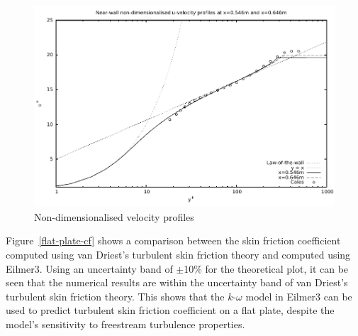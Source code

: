 %
\begin{figure}[h]
 \begin{center}
  \includegraphics[width=12.5cm]{./chap2-flat-plate/figs/coles-x-dimensionless.pdf}
 \end{center}
 \caption{Non-dimensionalised velocity profiles}
 \label{flat-plate-dimensionless-velocity}
\end{figure}
%
Figure~\ref{flat-plate-cf} shows a comparison between the skin friction coefficient 
computed using van Driest's turbulent skin friction theory and computed using Eilmer3. 
Using an uncertainty band of $\pm$10\% for the theoretical plot, it can be seen that 
the numerical results are within the uncertainty band of van Driest's turbulent skin 
friction theory. This shows that the $k$-$\omega$ model in Eilmer3 can be used to 
predict turbulent skin friction coefficient on a flat plate, despite the model's 
sensitivity to freestream turbulence properties.
